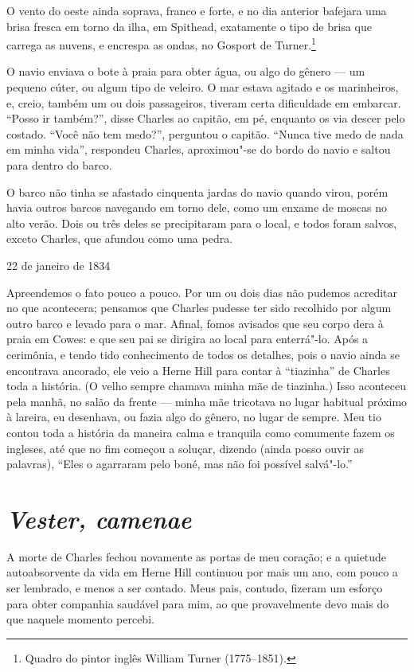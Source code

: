 O vento do oeste ainda soprava, franco e forte, e no dia anterior
bafejara uma brisa fresca em torno da ilha, em Spithead, exatamente o
tipo de brisa que carrega as nuvens, e encrespa as ondas, no Gosport de
Turner.\footnote{Quadro do pintor inglês William Turner (1775--1851).}

O navio enviava o bote à praia para obter água, ou algo do gênero --- um
pequeno cúter, ou algum tipo de veleiro. O mar estava agitado e os
marinheiros, e, creio, também um ou dois passageiros, tiveram certa
dificuldade em embarcar. ``Posso ir também?'', disse Charles ao capitão,
em pé, enquanto os via descer pelo costado. ``Você não tem medo?'',
perguntou o capitão. ``Nunca tive medo de nada em minha vida'',
respondeu Charles, aproximou"-se do bordo do navio e saltou para dentro
do barco.

O barco não tinha se afastado cinquenta jardas do navio quando virou,
porém havia outros barcos navegando em torno dele, como um enxame de
moscas no alto verão. Dois ou três deles se precipitaram para o local, e
todos foram salvos, exceto Charles, que afundou como uma pedra.

\begin{center}
22 de janeiro de 1834
\end{center}

Apreendemos o fato pouco a pouco. Por um ou dois dias não pudemos
acreditar no que acontecera; pensamos que Charles pudesse ter sido
recolhido por algum outro barco e levado para o mar. Afinal, fomos
avisados que seu corpo dera à praia em Cowes: e que seu pai se dirigira
ao local para enterrá"-lo. Após a cerimônia, e tendo tido conhecimento de
todos os detalhes, pois o navio ainda se encontrava ancorado, ele veio a
Herne Hill para contar à ``tiazinha'' de Charles toda a história. (O
velho sempre chamava minha mãe de tiazinha.) Isso aconteceu pela manhã,
no salão da frente --- minha mãe tricotava no lugar habitual próximo à
lareira, eu desenhava, ou fazia algo do gênero, no lugar de sempre. Meu
tio contou toda a história da maneira calma e tranquila como comumente
fazem os ingleses, até que no fim começou a soluçar, dizendo (ainda
posso ouvir as palavras), ``Eles o agarraram pelo boné, mas não foi
possível salvá"-lo.''


\chapter{\textit{Vester, camenae}} %

A morte de Charles fechou novamente as portas de meu coração; e a
quietude autoabsorvente da vida em Herne Hill continuou por mais um ano,
com pouco a ser lembrado, e menos a ser contado. Meus pais, contudo,
fizeram um esforço para obter companhia saudável para mim, ao que
provavelmente devo mais do que naquele momento percebi.

